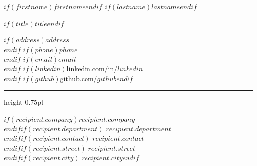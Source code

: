 \documentclass[10pt,a4paper]{article}
\begin{document}
\pagestyle{empty}

\begin{minipage}[t]{0.52\textwidth}
  {\LARGE\bfseries\color{accent} $if(firstname)$$firstname$$endif$ $if(lastname)$$lastname$$endif$}\par
  \vspace{0.06cm}
  {\large\bfseries\color{brand} $if(title)$$title$$endif$}\par
\end{minipage}
\hfill
\begin{minipage}[t]{0.45\textwidth}
  \RaggedLeft\small\color{textmuted}
  $if(address)${\color{brand}\faMapMarker*}\hspace{0.4em}$address$\\$endif$
  $if(phone)${\color{brand}\faPhone*}\hspace{0.4em}$phone$\\$endif$
  $if(email)${\color{brand}\faEnvelope}\hspace{0.4em}\href{mailto:$email$}{$email$}\\$endif$
  $if(linkedin)${\color{brand}\faLinkedin}\hspace{0.4em}\href{https://linkedin.com/in/$linkedin$}{linkedin.com/in/$linkedin$}\\$endif$
  $if(github)${\color{brand}\faGithub}\hspace{0.4em}\href{https://github.com/$github$}{github.com/$github$}$endif$
\end{minipage}

\vspace{0.25cm}
{\color{bordercolor}\hrule height 0.75pt}
\vspace{0.45cm}

\begin{minipage}[t]{\textwidth}
  \small\color{textdark}
  $if(recipient.company)${\textbf{$recipient.company$}}\\$endif$$if(recipient.department)$
  $recipient.department$\\$endif$$if(recipient.contact)$
  $recipient.contact$\\$endif$$if(recipient.street)$
  $recipient.street$\\$endif$$if(recipient.city)$
  $recipient.city$$endif$
\end{minipage}
\end{document}
